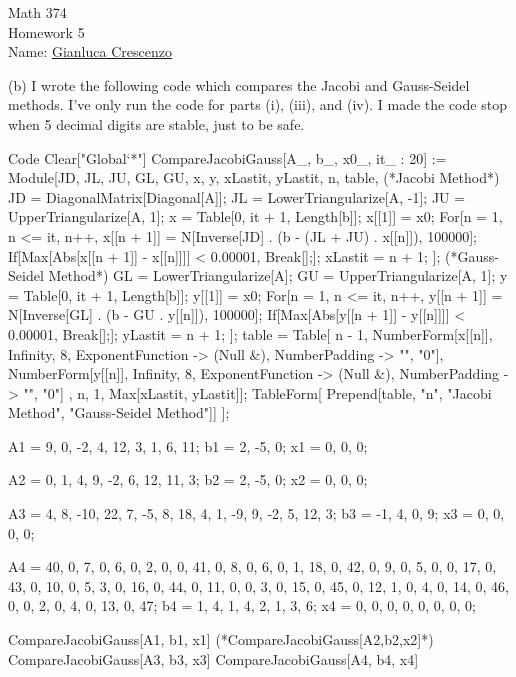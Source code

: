\documentclass[12pt,twoside,openany]{memoir}
\begin{document}
\begin{center}
{\large Math 374 \\[0.1in]Homework 5 \\[0.1in]}
{Name:} {\underline{Gianluca Crescenzo\hspace*{2in}}}\\[0.15in]
\end{center}
\vspace{4pt}
(b) I wrote the following code which compares the Jacobi and Gauss-Seidel methods. I've only run the code for parts (i), (iii), and (iv). I made the code stop when 5 decimal digits are stable, just to be safe.

\begin{mmaCell}[functionlocal=y]{Code}
Clear["Global`*"]
CompareJacobiGauss[A_, b_, x0_, it_ : 20] := 
  Module[{JD, JL, JU, GL, GU, x, y, xLastit, yLastit, n, table},
   (*Jacobi Method*)
   JD = DiagonalMatrix[Diagonal[A]];
   JL = LowerTriangularize[A, -1];
   JU = UpperTriangularize[A, 1];
   x = Table[0, {it + 1}, {Length[b]}];
   x[[1]] = x0;
   For[n = 1, n <= it, n++,
    x[[n + 1]] = N[Inverse[JD] . (b - (JL + JU) . x[[n]]), 100000];
    If[Max[Abs[x[[n + 1]] - x[[n]]]] < 0.00001, Break[];];
    	xLastit = n + 1;
    ];
   (*Gauss-Seidel Method*)
   GL = LowerTriangularize[A];
   GU = UpperTriangularize[A, 1];
   y = Table[0, {it + 1}, {Length[b]}];
   y[[1]] = x0;
   For[n = 1, n <= it, n++,
    y[[n + 1]] = N[Inverse[GL] . (b - GU . y[[n]]), 100000];
    If[Max[Abs[y[[n + 1]] - y[[n]]]] < 0.00001, Break[];];
    	yLastit = n + 1;
    ];
   table = Table[{
      n - 1,
      NumberForm[x[[n]], {Infinity, 8}, ExponentFunction -> (Null &), 
       NumberPadding -> {"", "0"}],
      NumberForm[y[[n]], {Infinity, 8}, ExponentFunction -> (Null &), 
       NumberPadding -> {"", "0"}]
      }, {n, 1, Max[xLastit, yLastit]}];
   TableForm[
    Prepend[table, {"n", "Jacobi Method", "Gauss-Seidel Method"}]]
   ];

A1 = {{9, 0, -2}, {4, 12, 3}, {1, 6, 11}};
b1 = {2, -5, 0};
x1 = {0, 0, 0};

A2 = {{0, 1, 4}, {9, -2, 6}, {12, 11, 3}};
b2 = {2, -5, 0};
x2 = {0, 0, 0};

A3 = {{4, 8, -10, 22}, {7, -5, 8, 18}, {4, 1, -9, 9}, {-2, 5, 12, 
    3}};
b3 = {-1, 4, 0, 9};
x3 = {0, 0, 0, 0};

A4 = 
  {{40, 0, 7, 0, 6, 0, 2, 0},
   {0, 41, 0, 8, 0, 6, 0, 1},
   {18, 0, 42, 0, 9, 0, 5, 0},
   {0, 17, 0, 43, 0, 10, 0, 5},
   {3, 0, 16, 0, 44, 0, 11, 0},
   {0, 3, 0, 15, 0, 45, 0, 12},
   {1, 0, 4, 0, 14, 0, 46, 0},
   {0, 2, 0, 4, 0, 13, 0, 47}};
b4 = {1, 4, 1, 4, 2, 1, 3, 6};
x4 = {0, 0, 0, 0, 0, 0, 0, 0};

CompareJacobiGauss[A1, b1, x1]
(*CompareJacobiGauss[A2,b2,x2]*)
CompareJacobiGauss[A3, b3, x3]
CompareJacobiGauss[A4, b4, x4]
\end{mmaCell}
\end{document}
